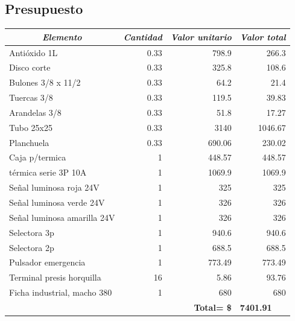 \subsection{Presupuesto}
\begin{table}[H]
	\centering
	\begin{tabular}{lr|r|r|}
		\hline
		\multicolumn{1}{|c|}{\textit{\textbf{Elemento}}} & \multicolumn{1}{c|}{\textit{\textbf{Cantidad}}} & \multicolumn{1}{c|}{\textit{\textbf{Valor unitario}}} & \multicolumn{1}{c|}{\textit{\textbf{Valor total}}} \\ \hline
		\multicolumn{1}{|l|}{Antióxido 1L} & 0.33 & 798.9 & 266.3 \\ \hline
		\multicolumn{1}{|l|}{Disco corte} & 0.33 & 325.8 & 108.6 \\ \hline
		\multicolumn{1}{|l|}{Bulones 3/8 x 11/2} & 0.33 & 64.2 & 21.4 \\ \hline
		\multicolumn{1}{|l|}{Tuercas 3/8} & 0.33 & 119.5 & 39.83 \\ \hline
		\multicolumn{1}{|l|}{Arandelas 3/8} & 0.33 & 51.8 & 17.27 \\ \hline
		\multicolumn{1}{|l|}{Tubo 25x25} & 0.33 & 3140 & 1046.67 \\ \hline
		\multicolumn{1}{|l|}{Planchuela} & 0.33 & 690.06 & 230.02 \\ \hline
		\multicolumn{1}{|l|}{Caja p/termica} & 1 & 448.57 & 448.57 \\ \hline
		\multicolumn{1}{|l|}{térmica serie 3P 10A} & 1 & 1069.9 & 1069.9 \\ \hline
		\multicolumn{1}{|l|}{Señal luminosa roja 24V} & 1 & 325 & 325 \\ \hline
		\multicolumn{1}{|l|}{Señal luminosa verde 24V} & 1 & 326 & 326 \\ \hline
		\multicolumn{1}{|l|}{Señal luminosa amarilla 24V} & 1 & 326 & 326 \\ \hline
		\multicolumn{1}{|l|}{Selectora 3p} & 1 & 940.6 & 940.6 \\ \hline
		\multicolumn{1}{|l|}{Selectora 2p} & 1 & 688.5 & 688.5 \\ \hline
		\multicolumn{1}{|l|}{Pulsador emergencia} & 1 & 773.49 & 773.49 \\ \hline
		\multicolumn{1}{|l|}{Terminal presis horquilla} & 16 & 5.86 & 93.76 \\ \hline
		\multicolumn{1}{|l|}{Ficha industrial, macho 380} & 1 & 680 & 680 \\ \hline
		& \multicolumn{1}{l|}{} & \textbf{Total=    \$} & \multicolumn{1}{l|}{\textbf{7401.91}} \\ \cline{3-4} 
	\end{tabular}
\end{table}

\newpage